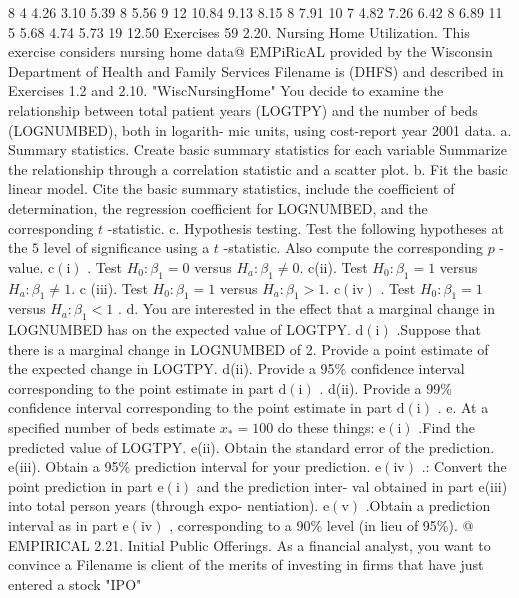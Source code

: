 \documentclass[11pt]{article}
\begin{document}
8 4 4.26 3.10 5.39 8 5.56
9 12 10.84 9.13 8.15 8 7.91
10 7 4.82 7.26 6.42 8 6.89
11 5 5.68 4.74 5.73 19 12.50
 Exercises 59
2.20. Nursing Home Utilization. This exercise considers nursing home data@ EMPiRicAL
provided by the Wisconsin Department of Health and Family Services Filename is
(DHFS) and described in Exercises 1.2 and 2.10. "WiscNursingHome"
You decide to examine the relationship between total patient years
(LOGTPY) and the number of beds (LOGNUMBED), both in logarith-
mic units, using cost-report year 2001 data.
a. Summary statistics. Create basic summary statistics for each variable
 Summarize the relationship through a correlation statistic and a scatter
 plot.
b. Fit the basic linear model. Cite the basic summary statistics,
include the coefficient of determination, the regression coefficient for
LOGNUMBED, and the corresponding \(t\) -statistic.
c. Hypothesis testing. Test the following hypotheses at the \(5\) level
of significance using a \(t\) -statistic. Also compute the corresponding
\(p\) -value.
\(\mathrm{c ( i )}\) . Test \(H_{0} : \beta_{1}=0\) versus \(H_{a} : \beta_{1} \neq0 .\)
c(ii). Test \(H_{0} : \beta_{1}=1\) versus \(H_{a} : \beta_{1} \neq1 .\)
\(\mathrm{c}\) (iii). Test \(H_{0} : \beta_{1}=1\) versus \(H_{a} : \beta_{1} > 1 .\)
\(\mathrm{c ( i v )}\) . Test \(H_{0} : \beta_{1}=1\) versus \(H_{a} : \beta_{1} < 1\) .
d. You are interested in the effect that a marginal change in
LOGNUMBED has on the expected value of LOGTPY.
\(\mathrm{d ( i )}\) .Suppose that there is a marginal change in LOGNUMBED of 2.
Provide a point estimate of the expected change in LOGTPY.
d(ii). Provide a 95\% confidence interval corresponding to the point
estimate in part \(\mathrm{d ( i )}\) .
d(ii). Provide a 99\% confidence interval corresponding to the point
estimate in part \(\mathrm{d ( i )}\) .
e. At a specified number of beds estimate \(x_{*}=1 0 0\) do these things:
\(\mathrm{e ( i )}\) .Find the predicted value of LOGTPY.
e(ii). Obtain the standard error of the prediction.
e(iii). Obtain a 95\% prediction interval for your prediction.
\(\mathrm{e ( i v )}\) .: Convert the point prediction in part \(\mathrm{e ( i )}\) and the prediction inter-
val obtained in part e(iii) into total person years (through expo-
nentiation).
\(\mathrm{e ( v )}\) .Obtain a prediction interval as in part \(\mathrm{e ( i v )}\) , corresponding to a
 90\% level (in lieu of 95\%). @ EMPIRICAL
2.21. Initial Public Offerings. As a financial analyst, you want to convince a Filename is
client of the merits of investing in firms that have just entered a stock "IPO"
\end{document}
